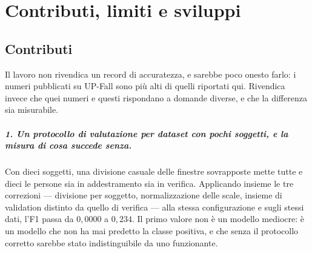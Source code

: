 \chapter{Contributi, limiti e sviluppi}
\label{cap:conclusioni}

%
%
%

\section{Contributi}
\label{sec:contributi}

Il lavoro non rivendica un record di accuratezza, e sarebbe poco onesto farlo: i numeri pubblicati su UP-Fall sono più alti di quelli riportati qui. Rivendica invece che quei numeri e questi rispondano a domande diverse, e che la differenza sia misurabile.

\paragraph{1. Un protocollo di valutazione per dataset con pochi soggetti, e la misura di cosa succede senza.} Con dieci soggetti, una divisione casuale delle finestre sovrapposte mette tutte e dieci le persone sia in addestramento sia in verifica. Applicando insieme le tre correzioni --- divisione per soggetto, normalizzazione delle scale, insieme di validation distinto da quello di verifica --- alla stessa configurazione e sugli stessi dati, l'F1 passa da $0{,}0000$ a $0{,}234$. Il primo valore non è un modello mediocre: è un modello che non ha mai predetto la classe positiva, e che senza il protocollo corretto sarebbe stato indistinguibile da uno funzionante.

